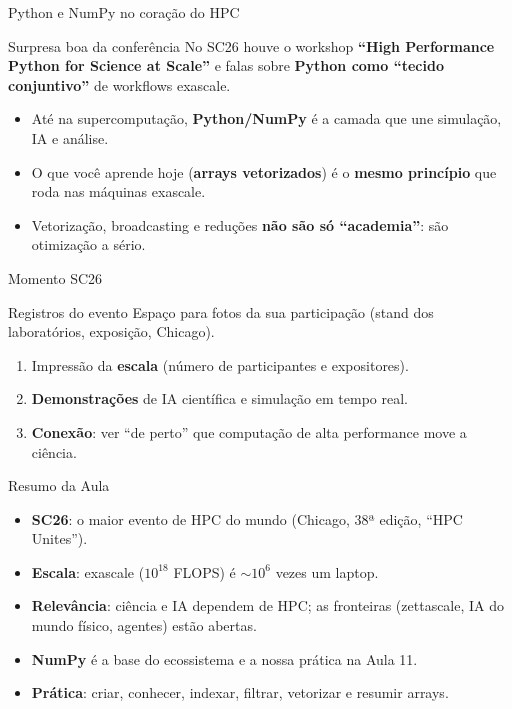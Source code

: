 \documentclass[aspectratio=169, 10pt]{beamer}
\begin{document}
\begin{frame}{Python e NumPy no coração do HPC}
  \begin{block}{Surpresa boa da conferência}
    No SC26 houve o workshop \textbf{``High Performance Python for Science at Scale''}
    e falas sobre \textbf{Python como ``tecido conjuntivo''} de workflows exascale.
  \end{block}
  \begin{itemize}
    \item Até na supercomputação, \textbf{Python/NumPy} é a camada que une simulação, IA e análise.
    \item O que você aprende hoje (\textbf{arrays vetorizados}) é o \textbf{mesmo princípio} que roda nas máquinas exascale.
    \item Vetorização, broadcasting e reduções \textbf{não são só ``academia''}: são otimização a sério.
  \end{itemize}
\end{frame}

\begin{frame}{Momento SC26}
  \begin{block}{Registros do evento}
    Espaço para fotos da sua participação (stand dos laboratórios, exposição, Chicago).
  \end{block}
  \begin{enumerate}
    \item Impressão da \textbf{escala} (número de participantes e expositores).
    \item \textbf{Demonstrações} de IA científica e simulação em tempo real.
    \item \textbf{Conexão}: ver ``de perto'' que computação de alta performance move a ciência.
  \end{enumerate}
\end{frame}

\begin{frame}{Resumo da Aula}
  \begin{itemize}
    \item \textbf{SC26}: o maior evento de HPC do mundo (Chicago, 38ª edição, ``HPC Unites'').
    \item \textbf{Escala}: exascale ($10^{18}$ FLOPS) é $\sim 10^{6}$ vezes um laptop.
    \item \textbf{Relevância}: ciência e IA dependem de HPC; as fronteiras (zettascale, IA do mundo físico, agentes) estão abertas.
    \item \textbf{NumPy} é a base do ecossistema e a nossa prática na Aula 11.
    \item \textbf{Prática}: criar, conhecer, indexar, filtrar, vetorizar e resumir arrays.
  \end{itemize}
\end{frame}
\end{document}
